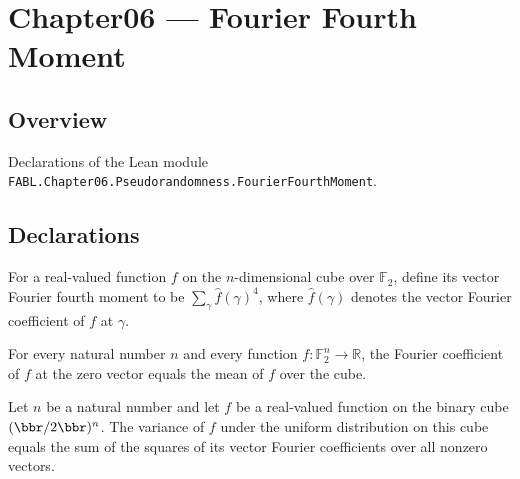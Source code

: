 \chapter{Chapter06 — Fourier Fourth Moment}
\section{Overview}

Declarations of the Lean module \texttt{FABL.Chapter06.Pseudorandomness.FourierFourthMoment}.

\section{Declarations}

\begin{definition}
\label{FABL.vectorFourierFourthMoment}
\leanok
{}
For a real-valued function $f$ on the $n$-dimensional cube over $\mathbb{F}_2$, define
its vector Fourier fourth moment to be $\sum_\gamma \widehat f(\gamma)^4$, where
$\widehat f(\gamma)$ denotes the vector Fourier coefficient of $f$ at $\gamma$.
\end{definition}

\begin{theorem}
\label{FABL.vectorFourierCoeff_zero_eq_mean}
\leanok
{}
For every natural number $n$ and every function $f:\mathbb{F}_2^n\to\mathbb{R}$, the
Fourier coefficient of $f$ at the zero vector equals the mean of $f$ over the cube.
\end{theorem}

\begin{theorem}
\label{FABL.variance_eq_sum_sq_vectorFourierCoeff_ne_zero}
\leanok
{}
Let $n$ be a natural number and let $f$ be a real-valued function on the binary cube
$(\bbr/2\bbr)^n$. The variance of $f$ under the uniform distribution on this cube equals
the sum of the squares of its vector Fourier coefficients over all nonzero vectors.
\end{theorem}

